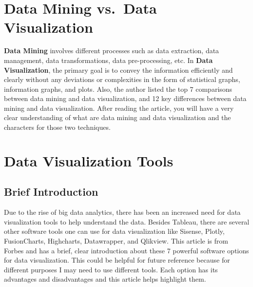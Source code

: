 \documentclass[]{book}
\theoremstyle{definition}
\theoremstyle{definition}
\theoremstyle{definition}
\theoremstyle{remark}
\begin{document}
\section{Data Mining vs.~Data
Visualization}\label{data-mining-vs.data-visualization}

\textbf{Data Mining} involves different processes such as data
extraction, data management, data transformations, data pre-processing,
etc. In \textbf{Data Visualization}, the primary goal is to convey the
information efficiently and clearly without any deviations or
complexities in the form of statistical graphs, information graphs, and
plots. Also, the author listed the top 7 comparisons between data mining
and data visualization, and 12 key differences between data mining and
data visualization. After reading the article, you will have a very
clear understanding of what are data mining and data visualization and
the characters for those two techniques.

\section{Data Visualization Tools}\label{data-visualization-tools}

\subsection{Brief Introduction}\label{brief-introduction}

Due to the rise of big data analytics, there has been an increased need
for data visualization tools to help understand the data. Besides
Tableau, there are several other software tools one can use for data
visualization like Sisense, Plotly, FusionCharts, Highcharts,
Datawrapper, and Qlikview. This article is from Forbes and has a brief,
clear introduction about these 7 powerful software options for data
visualization. This could be helpful for future reference because for
different purposes I may need to use different tools. Each option has
its advantages and disadvantages and this article helps highlight them.
\end{document}
